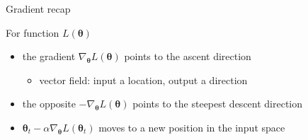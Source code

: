 \documentclass[ignorenonframetext,]{beamer}
\providecommand{\tightlist}{%
  \setlength{\itemsep}{0pt}\setlength{\parskip}{0pt}}
\newcommand{\vv}[1]{\boldsymbol{#1}}
\begin{document}
\begin{frame}{Gradient recap}
\protect\hypertarget{gradient-recap}{}

For function \(L(\vv{\theta})\)

\begin{itemize}
\tightlist
\item
  the gradient \(\nabla_{\vv{\theta}}L(\vv{\theta})\) points to the
  ascent direction

  \begin{itemize}
  \tightlist
  \item
    vector field: input a location, output a direction
  \end{itemize}
\item
  the opposite \(-\nabla_{\vv{\theta}}L(\vv{\theta})\) points to the
  steepest descent direction
\item
  \(\vv{\theta}_{t} - \alpha \nabla_{\vv{\theta}}L(\vv{\theta}_t)\)
  moves to a new position in the input space
\end{itemize}

\begin{columns}
    \begin{column}{0.48\textwidth}


\end{column}
\end{columns}
\end{frame}
\end{document}
